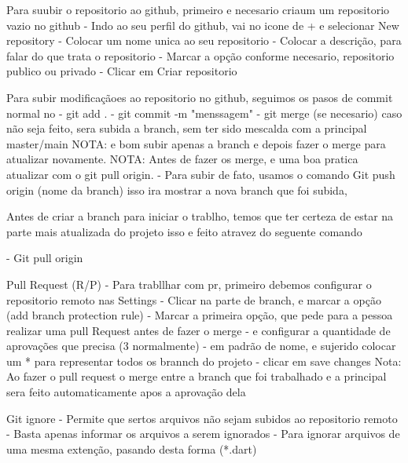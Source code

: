 Para suubir o repositorio ao github, primeiro e necesario criaum um repositorio vazio no github
 - Indo ao seu perfil do github, vai no icone de + e selecionar New repository
 - Colocar um nome unica ao seu repositorio
 - Colocar a descrição, para falar do que trata o repositorio
 - Marcar a opção conforme necesario, repositorio publico ou privado
 - Clicar em Criar repositorio

 
 Para subir modificaçãoes ao repositorio no github, seguimos os pasos de commit normal no
    - git add .
    - git commit -m "menssagem"
    - git merge (se necesario) caso não seja feito, sera subida a branch, sem ter sido mescalda com a principal master/main
    NOTA: e bom subir apenas a branch e depois fazer o merge para atualizar novamente.
    NOTA: Antes de fazer os merge, e uma boa pratica atualizar com o git pull origin.
    - Para subir de fato, usamos o comando Git push origin (nome da branch)
    isso ira mostrar a nova branch que foi subida,

Antes de criar a branch para iniciar o trablho, temos que ter certeza de estar na parte
mais atualizada do projeto isso e feito atravez do seguente comando

   - Git pull origin 

Pull Request (R/P)
   - Para trabllhar com pr, primeiro debemos configurar o repositorio remoto nas Settings 
   - Clicar na parte de branch, e marcar a opção (add branch protection rule)
   - Marcar a primeira opção, que pede para a pessoa realizar uma pull Request antes de fazer o merge
   - e configurar a quantidade de aprovações que precisa (3 normalmente)
   - em padrão de nome, e sujerido colocar um * para representar todos os brannch do projeto
   - clicar em save changes
   Nota: Ao fazer o pull request o merge entre a branch que foi trabalhado e a principal sera feito automaticamente
   apos a aprovação dela 

Git ignore
   - Permite que sertos arquivos não sejam subidos ao repositorio remoto
   - Basta apenas informar os arquivos a serem ignorados
   - Para ignorar arquivos de uma mesma extenção, pasando desta forma (*.dart)
   